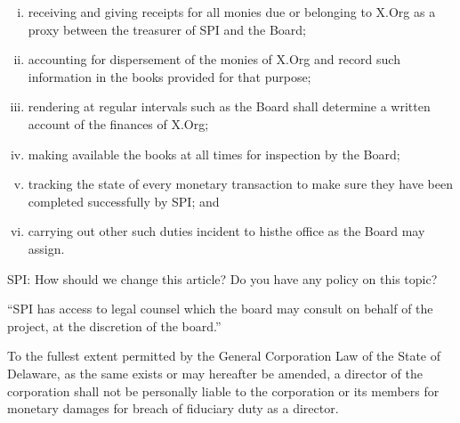 \documentclass[10pt, english]{bylaws}
\begin{document}
\begin{enumerate}[(i)\hspace{.2cm}]
	\item receiving and giving receipts for all monies due or belonging to
	X.Org as a proxy between the treasurer of SPI and the Board;

	\item accounting for dispersement of the monies of X.Org and record such
	information in the books provided for that purpose;

	\item rendering at regular intervals such as the Board shall determine a
	written account of the finances of X.Org;

	\item making available the books at all times for inspection by the
	Board;

	\item tracking the state of every monetary transaction to make sure
	they have been completed successfully by SPI; and

	\item carrying out other such duties incident to histhe office as the
	Board may assign.
\end{enumerate}


SPI: How should we change this article? Do you have any policy on this topic?

``SPI has access to legal counsel which the board may consult on behalf of the
project, at the discretion of the board.''

To the fullest extent permitted by the General Corporation Law of the State of
Delaware, as the same exists or may hereafter be amended, a director of the
corporation shall not be personally liable to the corporation or its members for
monetary damages for breach of fiduciary duty as a director.
\end{document}
